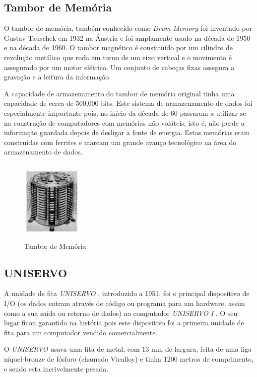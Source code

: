 \documentclass{report}
\begin{document}
		
		\subsection{Tambor de Memória}
		 O tambor de memória, também conhecido como\textit{ Drum Memory} foi inventado por Gustav Tauschek em 1932 na Áustria e foi amplamente usado na década de 1950 e na década de 1960.
		 O tambor magnético é constituído por um cilindro de revolução metálico que roda em torno de um eixo vertical e o movimento é assegurado por um motor elétrico. Um conjunto de cabeças fixas assegura a gravação e a leitura da informação
		 
		 A capacidade de armazenamento do tambor de memória original tinha uma capacidade de cerca de 500,000 bits. Este sistema de armazenamento de dados foi especialmente importante pois, no início da década de 60 passaram a utilizar-se na construção de computadores com memórias não voláteis, isto é, não perde a informação guardada depois de desligar a fonte de energia. Estas memórias eram construídas com ferrites e marcam um grande avanço tecnológico na área do armazenamento de dados.
	
	\begin{figure}[h]
		\centering
		\includegraphics[width=3cm, height=4cm]{tambordememoria.jpg}
		\caption{Tambor de Memória}
		\end{figure}

\newpage
	\subsection{UNISERVO}

	A unidade de fita \textit{UNISERVO}  , introduzido a 1951, foi o principal dispositivo de I/O (os dados entram através de código ou programa para um hardware, assim como a sua saída ou retorno de dados) no computador \textit{UNISERVO I} . O seu lugar ficou garantido na história pois este dispositivo foi a primeira unidade de fita para um computador vendido comercialmente. 
\vspace{1mm}	
	
	O \textit{UNISERVO}  usava uma fita de metal, com 13 mm de largura, feita de uma liga níquel-bronze de fósforo (chamado Vicalloy) e tinha 1200 metros de comprimento, e sendo esta incrivelmente pesada.
\vspace{1mm}
	
\end{document}
